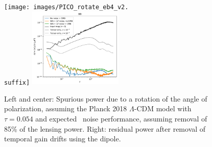 \documentclass[PICOReport.tex]{subfiles}
\begin{document}
\begin{figure}[htb]
\texttt{[image: images/PICO\_rotate\_eb4\_v2.\\suffix]} \includegraphics[width=0.4\textwidth]{images/calibration_spectrum_BB.pdf}
\caption{\label{fig:rot_bb_tb_eb} Left and center: Spurious power due to a rotation of the angle of polarization, assuming the Planck 2018 $\Lambda$-CDM model \citep{Planck2018_VI} with $\tau=0.054$ and expected \pico\ noise performance, assuming removal of 85\% of the lensing power.  Right: residual power after removal of temporal gain drifts using the dipole.}
\end{figure}
%
\end{document}
